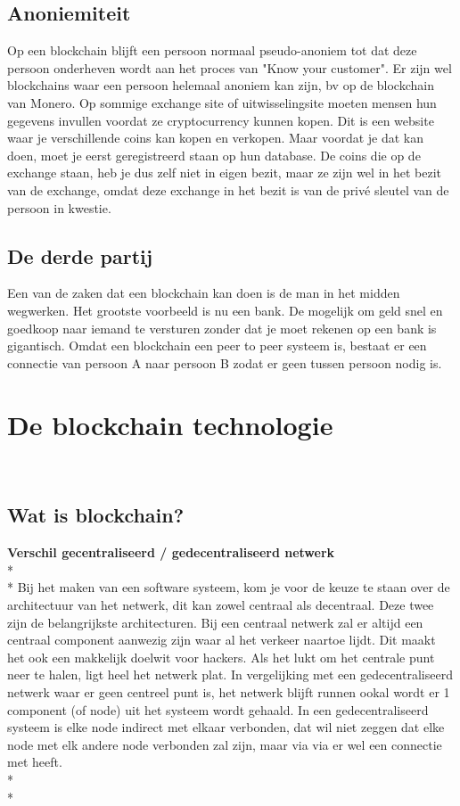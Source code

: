 \documentclass[fleqn,a4paper,12pt]{book}
\begin{document}
\section{Anoniemiteit}
Op een blockchain blijft een persoon normaal pseudo-anoniem tot dat deze persoon onderheven wordt aan het proces van "Know your customer". Er zijn wel blockchains waar een persoon helemaal anoniem kan zijn, bv op de blockchain van Monero. Op sommige exchange site of uitwisselingsite moeten mensen hun gegevens invullen voordat ze cryptocurrency kunnen kopen. Dit is een website waar je verschillende coins kan kopen en verkopen. Maar voordat je dat kan doen, moet je eerst geregistreerd staan op hun database. De coins die op de exchange staan, heb je dus zelf niet in eigen bezit, maar ze zijn wel in het bezit van de exchange, omdat deze exchange in het bezit is van de privé sleutel van de persoon in kwestie.

\section{De derde partij}
Een van de zaken dat een blockchain kan doen is de man in het midden wegwerken. Het grootste voorbeeld is nu een bank. De mogelijk om geld snel en goedkoop naar iemand te versturen zonder dat je moet rekenen op een bank is gigantisch. Omdat een blockchain een peer to peer systeem is, bestaat er een connectie van persoon A naar persoon B zodat er geen tussen persoon nodig is.

\chapter{De blockchain technologie}
~\autocite{blockchain1}

\section{Wat is blockchain?}
\textbf{Verschil gecentraliseerd / gedecentraliseerd netwerk}\\*\\*
Bij het maken van een software systeem, kom je voor de keuze te staan over de architectuur van het netwerk, dit kan zowel centraal als decentraal. Deze twee zijn de belangrijkste architecturen. Bij een centraal netwerk zal er altijd een centraal component aanwezig zijn waar al het verkeer naartoe lijdt. Dit maakt het ook een makkelijk doelwit voor hackers. Als het lukt om het centrale punt neer te halen, ligt heel het netwerk plat. In vergelijking met een gedecentraliseerd netwerk waar er geen centreel punt is, het netwerk blijft runnen ookal wordt er 1 component (of node) uit het systeem wordt gehaald. In een gedecentraliseerd systeem is elke node indirect met elkaar verbonden, dat wil niet zeggen dat elke node met elk andere node verbonden zal zijn, maar via via er wel een connectie met heeft.\\* \\*
\end{document}
